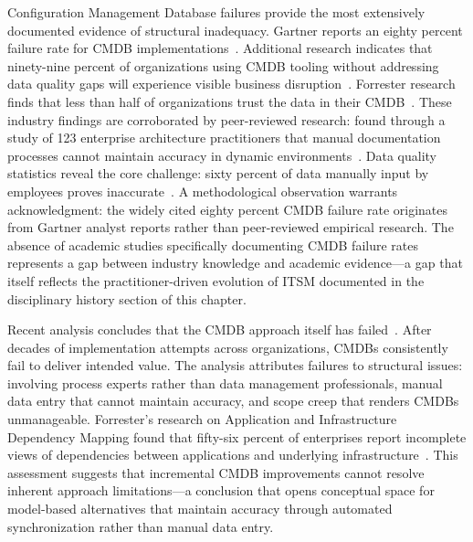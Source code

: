 Configuration Management Database failures provide the most extensively documented evidence of structural inadequacy. Gartner reports an eighty percent failure rate for CMDB implementations~\parencite{Gartner_CMDB_2019}. Additional research indicates that ninety-nine percent of organizations using CMDB tooling without addressing data quality gaps will experience visible business disruption~\parencite{Gartner_CMDB_2020}. Forrester research finds that less than half of organizations trust the data in their CMDB~\parencite{Forrester_CMDB_2020}. These industry findings are corroborated by peer-reviewed research: \citeauthor{Hauder_Matthes_Roth_2012} found through a study of 123 enterprise architecture practitioners that manual documentation processes cannot maintain accuracy in dynamic environments~\parencite{Hauder_Matthes_Roth_2012}. Data quality statistics reveal the core challenge: sixty percent of data manually input by employees proves inaccurate~\parencite{IBM_Data_Quality_2020}. A methodological observation warrants acknowledgment: the widely cited eighty percent CMDB failure rate originates from Gartner analyst reports rather than peer-reviewed empirical research. The absence of academic studies specifically documenting CMDB failure rates represents a gap between industry knowledge and academic evidence---a gap that itself reflects the practitioner-driven evolution of ITSM documented in the disciplinary history section of this chapter.

Recent analysis concludes that the CMDB approach itself has failed~\parencite{Forrester_CMDB_Dead_2025}. After decades of implementation attempts across organizations, CMDBs consistently fail to deliver intended value. The analysis attributes failures to structural issues: involving process experts rather than data management professionals, manual data entry that cannot maintain accuracy, and scope creep that renders CMDBs unmanageable. Forrester's research on Application and Infrastructure Dependency Mapping found that fifty-six percent of enterprises report incomplete views of dependencies between applications and underlying infrastructure~\parencite{Forrester_AIDM_2018}. This assessment suggests that incremental CMDB improvements cannot resolve inherent approach limitations---a conclusion that opens conceptual space for model-based alternatives that maintain accuracy through automated synchronization rather than manual data entry.

